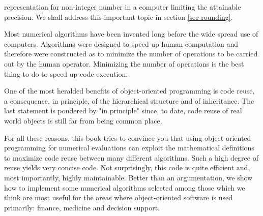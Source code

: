 \documentclass[twoside]{book}
\begin{document}
representation for non-integer number in a computer limiting the
attainable precision. We shall address this important topic in
section \ref{sec-rounding}.
\par
Most numerical algorithms have been invented long before the wide
spread use of computers. Algorithms were designed to speed up
human computation and therefore were constructed as to minimize
the number of operations to be carried out by the human operator.
Minimizing the number of operations is the best thing to do to
speed up code execution.
\par
One of the most heralded benefits of object-oriented programming
is code reuse, a consequence, in principle, of the hierarchical
structure and of inheritance. The last statement is pondered by
"in principle" since, to date, code reuse of real world objects is
still far from being common place.
\par
For all these reasons, this book tries to convince you that using
object-oriented programming for numerical evaluations can exploit
the mathematical definitions to maximize code reuse between many
different algorithms. Such a high degree of reuse yields very
concise code. Not surprisingly, this code is quite efficient and,
most importantly, highly maintainable. Better than an
argumentation, we show how to implement some numerical algorithms
selected among those which we think are most useful for the areas
where object-oriented software is used primarily: finance,
medicine and decision support.
\end{document}
